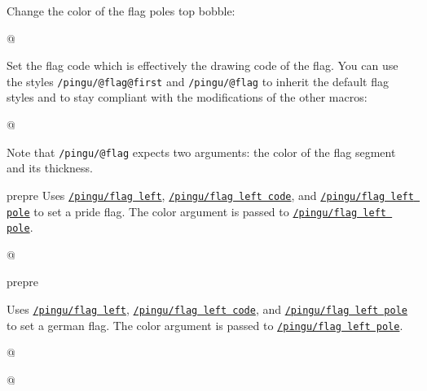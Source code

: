 \documentclass[parskip=half,english,numbers=noenddot,footnotes=nomultiple,oneside]{scrartcl}
\makeatletter
\def\lpingu#1{\lstinline[style=lstpingu,language=pingulang]'#1'}
\def\@showcase@pre{pre}
\let\@showcase@cur\@showcase@pre
\def\@toggle@showcase{\ifx\@showcase@cur\@showcase@pre\global\let\@showcase@cur\@empty\else \global\let\@showcase@cur\@showcase@pre\fi}
\newcommand*\keyref[2][/pingu/]{\hyperref[pk:#1#2]{\lpingu{#1#2}}}
\makeatother
\begin{document}
Change the color of the flag poles top bobble:
	\begin{tcblisting}{@}
\begin{tikzpicture}
	\pingu[flag left, flag left bobble=green]
\end{tikzpicture}
\end{tcblisting}
\endsubkeyexplain

Set the flag code which is effectively the drawing code of the flag.
You can use the styles \lpingu{/pingu/@flag@first} and \lpingu{/pingu/@flag} to inherit the default flag styles and to stay compliant with the modifications of the other macros:
	\begin{tcblisting}{@}
\begin{tikzpicture}
	\pingu[flag left, flag left code={
	  \node[/pingu/@flag@first,
	  	/pingu/@flag={blue}{5mm}]
	  		(upper) at (0,0) {};
	  \node[below,/pingu/@flag={black}{4mm}]
	  	(lower) at (upper.south) {};
	}]
\end{tikzpicture}
\end{tcblisting}
Note that \lpingu{/pingu/@flag} expects two arguments: the color of the flag segment and its thickness.
\endsubkeyexplain

\@toggle@showcase %
	Uses \keyref{flag left}, \keyref{flag left code}, and \keyref{flag left pole} to set a pride flag. The color argument is passed to \keyref{flag left pole}.
\begin{tcblisting}{@}
\begin{tikzpicture}
	\pingu[pride flag left=green]
\end{tikzpicture}
\end{tcblisting}
\endshowkeyexplain
\@toggle@showcase %


	Uses \keyref{flag left}, \keyref{flag left code}, and \keyref{flag left pole} to set a german flag. The color argument is passed to \keyref{flag left pole}.
\begin{tcblisting}{@}
\begin{tikzpicture}
	\pingu[german flag left=green]
\end{tikzpicture}
\end{tcblisting}
\endshowkeyexplain


\begin{tcblisting}{@}
\begin{tikzpicture}
	\pingu[flag right=green]
\end{tikzpicture}
\end{tcblisting}
\endshowkeyexplain
\end{document}
